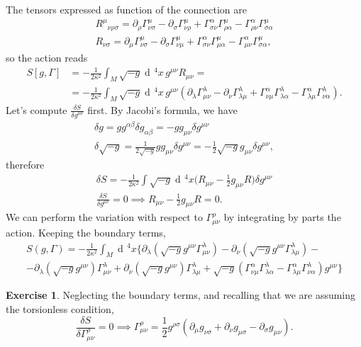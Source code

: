 \documentclass[a4paper,12pt]{book}
\newcommand{\dd}{\mathop{\mathrm{d}\!}{}}
\theoremstyle{definition}
\newtheorem{exercise}{Exercise}
\theoremstyle{remark}
\begin{document}
The tensors expressed as function of the connection are
\begin{gather*}
R^\mu{}_{\nu\rho\sigma}=\partial_\rho\Gamma^\mu_{\nu\sigma}-\partial_\sigma\Gamma^\mu_{\nu\rho}+\Gamma^\alpha_{\sigma\nu}\Gamma^\mu_{\rho\alpha}-\Gamma^\alpha_{\rho\nu}\Gamma^\mu_{\sigma\alpha}\\
R_{\nu\sigma}=\partial_\mu\Gamma^\mu_{\nu\sigma}-\partial_\sigma\Gamma^\mu_{\nu\mu}+\Gamma^\alpha_{\sigma\nu}\Gamma^\mu_{\mu\alpha}-\Gamma^\alpha_{\mu\nu}\Gamma^\mu_{\sigma\alpha},
\end{gather*}
so the action reads
\begin{align*}
S[g,\Gamma]&=-\frac1{2\kappa^2}\int_M\sqrt{-g}\dd^4x\,g^{\mu\nu}R_{\mu\nu}=\\
&=-\frac1{2\kappa^2}\int_M\sqrt{-g}\dd^4x\,g^{\mu\nu}(\partial_\lambda\Gamma^\lambda_{\mu\nu}-\partial_\nu\Gamma^\lambda_{\lambda\mu}+\Gamma^\alpha_{\nu\mu}\Gamma^\lambda_{\lambda\alpha}-\Gamma^\alpha_{\lambda\mu}\Gamma^\lambda_{\nu\alpha}).
\end{align*}
Let's compute $\frac{\delta S}{\delta g^{\mu\nu}}$ first. By Jacobi's formula, we have
\begin{gather*}
\delta g=gg^{\alpha\beta}\delta g_{\alpha\beta}=-gg_{\mu\nu}\delta g^{\mu\nu}\\
\delta\sqrt{-g}=\frac1{2\sqrt{-g}}gg_{\mu\nu}\delta g^{\mu\nu}=-\frac12\sqrt{-g}g_{\mu\nu}\delta g^{\mu\nu},
\end{gather*}
therefore
\begin{gather*}
\delta S=-\frac1{2\kappa^2}\int\sqrt{-g}\dd^4x\biggl(R_{\mu\nu}-\frac12g_{\mu\nu}R\biggr)\delta g^{\mu\nu}\\
\frac{\delta S}{\delta g^{\mu\nu}}=0\implies R_{\mu\nu}-\frac12g_{\mu\nu}R=0.
\end{gather*}
We can perform the variation with respect to $\Gamma^\rho_{\mu\nu}$ by integrating by parts the action. Keeping the boundary terms,
\begin{multline*}
S(g,\Gamma)=-\frac1{2\kappa^2}\int_M\dd^4x\bigl\{\partial_\lambda(\sqrt{-g}g^{\mu\nu}\Gamma^\lambda_{\mu\nu})-\partial_\nu(\sqrt{-g}g^{\mu\nu}\Gamma^\lambda_{\lambda\mu})-{}\\
-\partial_\lambda(\sqrt{-g}g^{\mu\nu})\Gamma^\lambda_{\mu\nu}+\partial_\nu(\sqrt{-g}g^{\mu\nu})\Gamma^\lambda_{\lambda\mu}+\sqrt{-g}(\Gamma^\alpha_{\nu\mu}\Gamma^\lambda_{\lambda\alpha}-\Gamma^\alpha_{\lambda\mu}\Gamma^\lambda_{\nu\alpha})g^{\mu\nu}\bigr\}
\end{multline*}
\begin{exercise}
\label{thm:varGamma}
Neglecting the boundary terms, and recalling that we are assuming the torsionless condition,
\[\frac{\delta S}{\delta\Gamma^\rho_{\mu\nu}}=0\implies\Gamma^\rho_{\mu\nu}=\frac12g^{\rho\sigma}(\partial_\mu g_{\nu\sigma}+\partial_\nu g_{\mu\sigma}-\partial_\sigma g_{\mu\nu}).\]
\end{exercise}
\end{document}
